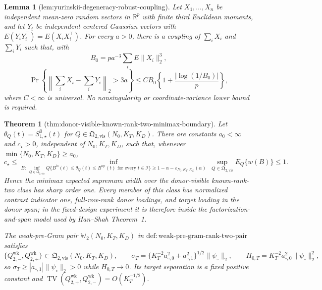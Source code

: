 \documentclass{article}
\newtheorem{theorem}{Theorem}
\newtheorem{lemma}{Lemma}
\begin{document}
\begin{lemma}[lem:yurinskii-degeneracy-robust-coupling]\label{lem:yurinskii-degeneracy-robust-coupling}
Let \(X_1,\ldots,X_n\) be independent mean-zero random vectors in \(\mathbb R^p\) with finite third Euclidean moments, and let \(Y_i\) be independent centered Gaussian vectors with \(E(Y_iY_i^\top)=E(X_iX_i^\top)\). For every \(a>0\), there is a coupling of \(\sum_iX_i\) and \(\sum_iY_i\) such that, with
\[
 B_0=p a^{-3}\sum_iE\|X_i\|_2^3,
\]
\[
 \Pr\left\{\left\|\sum_iX_i-\sum_iY_i\right\|_2>3a\right\}
 \le C B_0\left\{1+\frac{|\log(1/B_0)|}{p}\right\},
\]
where \(C<\infty\) is universal. No nonsingularity or coordinate-variance lower bound is required.
\end{lemma}

\begin{theorem}[thm:donor-visible-known-rank-two-minimax-boundary]\label{thm:donor-visible-known-rank-two-minimax-boundary}
Let \(\theta_Q(t)=S^0_{1,\star}(t)\) for \(Q\in\mathfrak Q_{2,\mathrm{vis}}(N_0,K_T,K_D)\).  There are constants \(a_0<\infty\) and \(c_\star>0\), independent of \(N_0,K_T,K_D\), such that, whenever \(\min\{N_0,K_T,K_D\}\ge a_0\),
\[
 c_\star\le
 \inf_{B:\ \inf_{Q\in\mathfrak Q_{2,\mathrm{vis}}}
 Q\{B^{\mathrm{lo}}(t)\le\theta_Q(t)\le B^{\mathrm{up}}(t)
 \text{ for every }t\in\mathcal I\}
 \ge1-\alpha-\varepsilon_{N_0,K_T,K_D}(\alpha)}
 \ \sup_{Q\in\mathfrak Q_{2,\mathrm{vis}}}E_Q\{w(B)\}
 \le1.
\]
Hence the minimax expected supremum width over the donor-visible known-rank-two class has sharp order one.  Every member of this class has normalized contrast indicator one, full-row-rank donor loadings, and target loading in the donor span; in the fixed-design experiment it is therefore inside the factorization-and-span model used by Han--Shah Theorem~1.

The weak-pre-Gram pair \(\mathbb W_2(N_0,K_T,K_D)\) in \(\mathrm{def:weak\mbox{-}pre\mbox{-}gram\mbox{-}rank\mbox{-}two\mbox{-}pair}\) satisfies
\[
 \{Q_{2,-}^{\mathrm{wk}},Q_{2,+}^{\mathrm{wk}}\}
 \subset\mathfrak Q_{2,\mathrm{vis}}(N_0,K_T,K_D),
 \qquad
 \sigma_T=\{K_T^{-2}a_{\circ,0}^2+a_{\circ,1}^2\}^{1/2}\|\psi_\circ\|_2,
 \qquad
 H_{0,T}=K_T^{-2}a_{\circ,0}^2\|\psi_\circ\|_2^2,
\]
so \(\sigma_T\ge|a_{\circ,1}|\|\psi_\circ\|_2>0\) while \(H_{0,T}\to0\).  Its target separation is a fixed positive constant and
\(\operatorname{TV}(Q_{2,+}^{\mathrm{wk}},Q_{2,-}^{\mathrm{wk}})=O(K_T^{-1/2})\).


\end{theorem}
\end{document}
